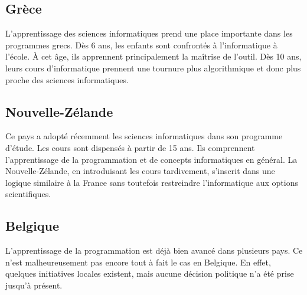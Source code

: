 \subsection{Grèce}
L'apprentissage des sciences informatiques prend une place importante dans les programmes grecs. Dès 6 ans, les enfants sont confrontés à l'informatique à l'école. À cet âge, ils apprennent principalement la maîtrise de l'outil. Dès 10 ans, leurs cours d'informatique prennent une tournure plus algorithmique et donc plus proche des sciences informatiques.

\subsection{Nouvelle-Zélande}
Ce pays a adopté récemment les sciences informatiques dans son programme d'étude. Les cours sont dispensés à partir de 15 ans. Ils comprennent l'apprentissage de la programmation et de concepts informatiques en général. La Nouvelle-Zélande, en introduisant les cours tardivement, s'inscrit dans une logique similaire à la France sans toutefois restreindre l'informatique aux options scientifiques.

\subsection{Belgique}
L'apprentissage de la programmation est déjà bien avancé dans plusieurs pays. Ce n'est malheureusement pas encore tout à fait le cas en Belgique. En effet, quelques initiatives locales existent, mais aucune décision politique n'a été prise jusqu'à présent.
